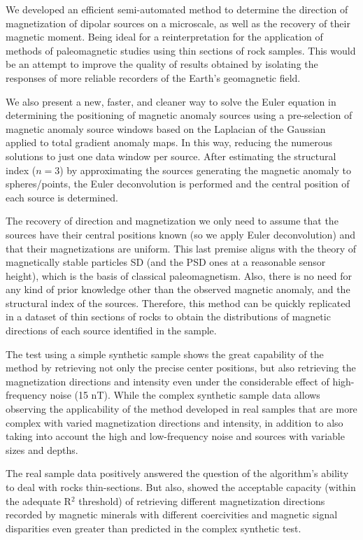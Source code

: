 We developed an efficient semi-automated method to determine the direction of
magnetization of dipolar sources on a microscale, as well as the recovery of
their magnetic moment. Being ideal for a reinterpretation for the application
of methods of paleomagnetic studies using thin sections of rock samples. This
would be an attempt to improve the quality of results obtained by isolating the
responses of more reliable recorders of the Earth's geomagnetic field.

We also present a new, faster, and cleaner way to solve the Euler equation in
determining the positioning of magnetic anomaly sources using a pre-selection
of magnetic anomaly source windows based on the Laplacian of the Gaussian
applied to total gradient anomaly maps. In this way, reducing the numerous
solutions to just one data window per source. After estimating the structural
index ($n = 3$) by approximating the sources generating the magnetic anomaly to
spheres/points, the Euler deconvolution is performed and the central position
of each source is determined.

The recovery of direction and magnetization we only need to assume that the
sources have their central positions known (so we apply Euler deconvolution)
and that their magnetizations are uniform. This last premise aligns with the
theory of magnetically stable particles SD (and the PSD ones at a reasonable
sensor height), which is the basis of classical paleomagnetism. Also, there is
no need for any kind of prior knowledge other than the observed magnetic
anomaly, and the structural index of the sources. Therefore, this method can be
quickly replicated in a dataset of thin sections of rocks to obtain the
distributions of magnetic directions of each source identified in the sample.

The test using a simple synthetic sample shows the great capability of the
method by retrieving not only the precise center positions, but also retrieving
the magnetization directions and intensity even under the considerable effect
of high-frequency noise (15 nT). While the complex synthetic sample data allows
observing the applicability of the method developed in real samples that are
more complex with varied magnetization directions and intensity, in addition to
also taking into account the high and low-frequency noise and sources with
variable sizes and depths.

The real sample data positively answered the question of the algorithm's
ability to deal with rocks thin-sections. But also, showed the acceptable
capacity (within the adequate R$^2$ threshold) of retrieving different
magnetization directions recorded by magnetic minerals with different
coercivities and magnetic signal disparities even greater than predicted in the
complex synthetic test.



